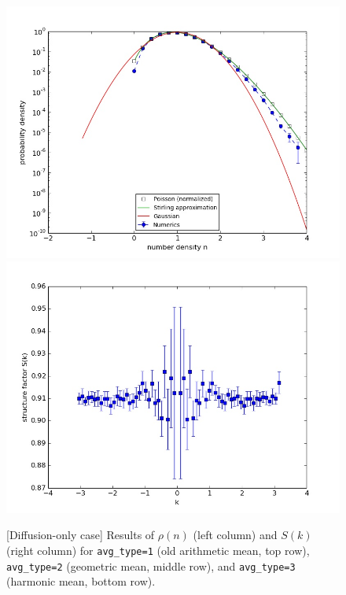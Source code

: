 \documentclass{article}
\begin{document}
\begin{figure}[ht!]
\includegraphics[width=0.5\linewidth]{fig1/diff_hist_avg3.jpg}
\includegraphics[width=0.5\linewidth]{fig1/diff_Sk_avg3.jpg}
\caption{\label{fig_diff_123}[Diffusion-only case] Results of $\rho(n)$ (left column) and $S(k)$ (right column) for \texttt{avg\_type=1} (old arithmetic mean, top row), \texttt{avg\_type=2} (geometric mean, middle row), and \texttt{avg\_type=3} (harmonic mean, bottom row).
}
\end{figure}
\end{document}
